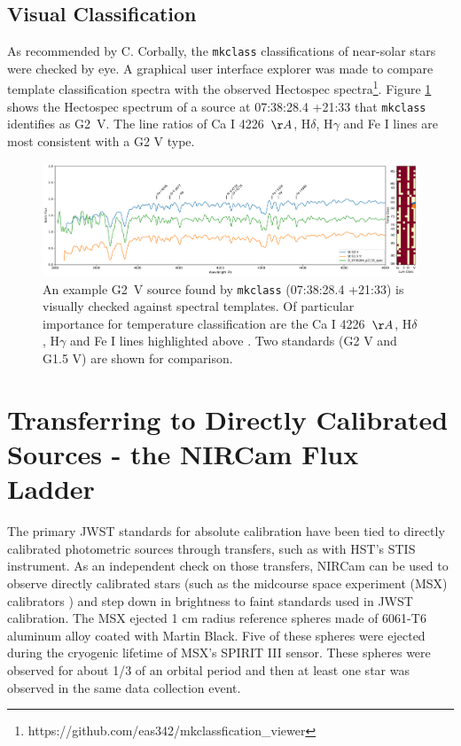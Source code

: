 \documentclass{aastex6}
\begin{document}
\subsection{Visual Classification}

As recommended by C. Corbally, the \texttt{mkclass} classifications of near-solar stars were checked by eye.
A graphical user interface explorer was made to compare template classification spectra with the observed Hectospec spectra\footnote{https://github.com/eas342/mkclassfication\_viewer}.
Figure \ref{fig:0738284p2133class} shows the Hectospec spectrum of a source at 07:38:28.4 +21:33 that \texttt{mkclass} identifies as G2~V.
The line ratios of Ca I 4226~$\AA$, H$\delta$, H$\gamma$ and Fe I lines are most consistent with a G2 V type.

\begin{figure}[!hbtp]
\centering
\includegraphics[width=.95\columnwidth]{O_0738284_p2133_class_g2v.pdf}
\caption{An example G2~V source found by \texttt{mkclass} (07:38:28.4 +21:33) is visually checked against spectral templates.
Of particular importance for temperature classification are the Ca I 4226~$\AA$, H$\delta$, H$\gamma$ and Fe I lines highlighted above \citep{gray2009specClass}.
Two standards (G2 V and G1.5 V) are shown for comparison.}\label{fig:0738284p2133class}
\end{figure}

\clearpage

\section{Transferring to Directly Calibrated Sources - the NIRCam Flux Ladder}

The primary JWST standards for absolute calibration have been tied to directly calibrated photometric sources through transfers, such as with HST's STIS instrument.
As an independent check on those transfers, NIRCam can be used to observe directly calibrated stars (such as the midcourse space experiment (MSX) calibrators \citep{price2004msxCal}) and step down in brightness to faint standards used in JWST calibration.
The MSX ejected 1 cm radius reference spheres made of 6061-T6 aluminum alloy coated with Martin Black.
Five of these spheres were ejected during the cryogenic lifetime of MSX's SPIRIT III sensor.
These spheres were observed for about 1/3 of an orbital period and then at least one star was observed in the same data collection event.
\end{document}
